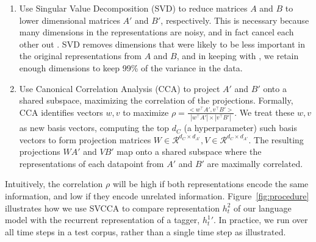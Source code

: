 \begin{enumerate}
\item Use Singular Value Decomposition (SVD) to reduce matrices $A$ and $B$ to lower dimensional matrices $A'$ and $B'$, respectively. This is necessary because many dimensions in the representations are noisy, and in fact cancel each other out \cite{frankle_lottery_2018}. SVD removes dimensions that were likely to be less important in the original representations from $A$ and $B$, and in keeping with \citeauthor{raghu_svcca:_2017}, we retain enough dimensions to keep 99\% of the variance in the data.
\item Use Canonical Correlation Analysis (CCA) to project $A'$ and $B'$ onto a shared subspace, maximizing the correlation of the projections. Formally, CCA identifies vectors $w,v$ to maximize $\rho = \frac{<w^\top A', v^\top B'>}{| 
w^\top A' | \times | v^\top B' |}$. We treat these $w,v$  as new basis vectors, computing the top $d_C$ (a  hyperparameter) such basis vectors  to form projection matrices $W \in \mathcal{R}^{d_C \times d_{A'}}, V \in \mathcal{R}^{d_C \times d_{A'}} $. The resulting projections $WA'$ and $VB'$  map onto a shared subspace where the representations of each datapoint from $A'$ and $B'$ are maximally correlated. 
\end{enumerate}

Intuitively, the correlation $\rho$ will be high if both representations encode the same information, and low if they encode unrelated information. Figure~\ref{fig:procedure} illustrates how we use SVCCA to compare representation $h_t^2$ of our language model with the recurrent representation of a tagger, $h_t^1{}'$. In practice, we run over all time steps in a test corpus, rather than a single time step as illustrated. 


